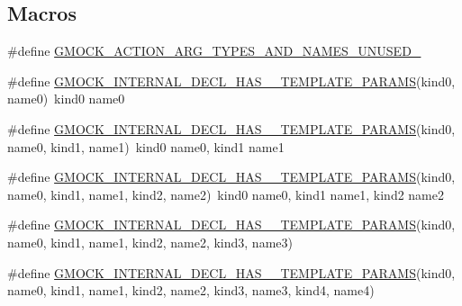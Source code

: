 \subsection*{Macros}
\begin{DoxyCompactItemize}
\item 
\#define \mbox{\hyperlink{_obj__test_2lib_2googletest-master_2googlemock_2include_2gmock_2gmock-generated-actions_8h_a069f37fdbe36aabe65da6eb6221b9b19}{G\+M\+O\+C\+K\+\_\+\+A\+C\+T\+I\+O\+N\+\_\+\+A\+R\+G\+\_\+\+T\+Y\+P\+E\+S\+\_\+\+A\+N\+D\+\_\+\+N\+A\+M\+E\+S\+\_\+\+U\+N\+U\+S\+E\+D\+\_\+}}
\item 
\#define \mbox{\hyperlink{_obj__test_2lib_2googletest-master_2googlemock_2include_2gmock_2gmock-generated-actions_8h_a8b8b1a43495f82aefe40c410bc1ce392}{G\+M\+O\+C\+K\+\_\+\+I\+N\+T\+E\+R\+N\+A\+L\+\_\+\+D\+E\+C\+L\+\_\+\+H\+A\+S\+\_\+\_\+\+T\+E\+M\+P\+L\+A\+T\+E\+\_\+\+P\+A\+R\+A\+MS}}(kind0,  name0)~kind0 name0
\item 
\#define \mbox{\hyperlink{_obj__test_2lib_2googletest-master_2googlemock_2include_2gmock_2gmock-generated-actions_8h_aa238172d277a7ba189a5d481356a6c66}{G\+M\+O\+C\+K\+\_\+\+I\+N\+T\+E\+R\+N\+A\+L\+\_\+\+D\+E\+C\+L\+\_\+\+H\+A\+S\+\_\+\_\+\+T\+E\+M\+P\+L\+A\+T\+E\+\_\+\+P\+A\+R\+A\+MS}}(kind0,  name0,  kind1,  name1)~kind0 name0, kind1 name1
\item 
\#define \mbox{\hyperlink{_obj__test_2lib_2googletest-master_2googlemock_2include_2gmock_2gmock-generated-actions_8h_ae776d1f23c7b8defac49269c69e64baa}{G\+M\+O\+C\+K\+\_\+\+I\+N\+T\+E\+R\+N\+A\+L\+\_\+\+D\+E\+C\+L\+\_\+\+H\+A\+S\+\_\+\_\+\+T\+E\+M\+P\+L\+A\+T\+E\+\_\+\+P\+A\+R\+A\+MS}}(kind0,  name0,  kind1,  name1,  kind2,  name2)~kind0 name0, kind1 name1, kind2 name2
\item 
\#define \mbox{\hyperlink{_obj__test_2lib_2googletest-master_2googlemock_2include_2gmock_2gmock-generated-actions_8h_a19b48575600b1a046c3f77d5dfc124ba}{G\+M\+O\+C\+K\+\_\+\+I\+N\+T\+E\+R\+N\+A\+L\+\_\+\+D\+E\+C\+L\+\_\+\+H\+A\+S\+\_\+\_\+\+T\+E\+M\+P\+L\+A\+T\+E\+\_\+\+P\+A\+R\+A\+MS}}(kind0,  name0,  kind1,  name1,  kind2,  name2,  kind3,  name3)
\item 
\#define \mbox{\hyperlink{_obj__test_2lib_2googletest-master_2googlemock_2include_2gmock_2gmock-generated-actions_8h_aef0f11711d63f65561ce5a4d032673f8}{G\+M\+O\+C\+K\+\_\+\+I\+N\+T\+E\+R\+N\+A\+L\+\_\+\+D\+E\+C\+L\+\_\+\+H\+A\+S\+\_\+\_\+\+T\+E\+M\+P\+L\+A\+T\+E\+\_\+\+P\+A\+R\+A\+MS}}(kind0,  name0,  kind1,  name1,  kind2,  name2,  kind3,  name3,  kind4,  name4)
\item 

\end{DoxyCompactItemize}
